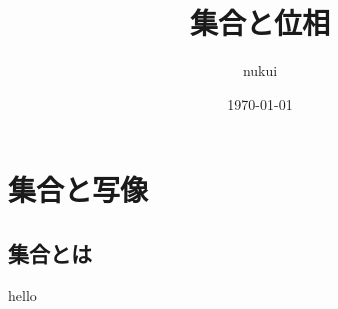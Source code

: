 \documentclass{jsarticle}
\begin{document}
\title{集合と位相}
\author{nukui}
\date{\today}
\maketitle


\section{集合と写像}
\subsection{集合とは}
hello
\end{document}
